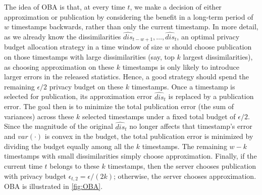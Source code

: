 \documentclass[acmsmall]{acmart}
\newcommand{\hdis}{\hat{\mathit{dis}}}
\newcommand{\var}{\mathit{var}}
\begin{document}
The idea of OBA is that, at every time $t$, we make a decision of either
approximation or publication by considering the benefit in a long-term period of
$w$ timestamps backwards, rather than only the current timestamp.
In more detail, as we already know the dissimilarities $\hdis_{t-w+1}, \ldots,
\hdis_t$, an optimal privacy budget allocation strategy in a time window of size
$w$ should choose publication on those timestamps with large dissimilarities
(say, top $k$ largest dissimilarities), as choosing approximation on these $k$
timestamps is only likely to introduce larger errors in the released statistics.
Hence, a good strategy should spend the remaining $\epsilon/2$ privacy budget on
these $k$ timestamps.
Once a timestamp is selected for publication, its approximation error $\hdis_t$ is replaced by a publication error. The goal then is to minimize the total publication error (the sum of variances) across these $k$ selected timestamps under a fixed total budget of $\epsilon/2$. Since the magnitude of the original $\hdis_t$ no longer affects that timestamp’s error and $\var(\cdot)$ is convex in the budget, the total publication error is minimized by dividing the budget equally among all the $k$ timestamps.
The remaining $w-k$ timestamps with small dissimilarities simply choose
approximation.
Finally, if the current time $t$ belongs to these $k$ timestamps, then the server
chooses publication with privacy budget $\epsilon_{t,2}=\epsilon/(2k)$;
otherwise, the server chooses approximation.
OBA is illustrated in \cref{fig:OBA}.
\end{document}
